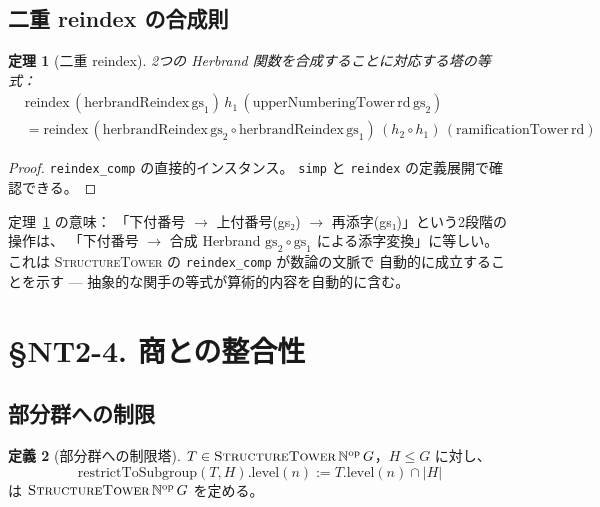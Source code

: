 \documentclass[a4paper,11pt]{ltjsarticle}
\theoremstyle{definition}
\newtheorem{definition}{定義}[section]
\theoremstyle{plain}
\newtheorem{theorem}[definition]{定理}
\theoremstyle{remark}
\begin{document}
\subsection{二重 reindex の合成則}

\begin{theorem}[二重 reindex]\label{thm:double-reindex}
  2つの Herbrand 関数を合成することに対応する塔の等式：
  \begin{align*}
    &\mathrm{reindex}\,(\mathrm{herbrandReindex}\,\mathrm{gs}_1)\,h_1\,
     (\mathrm{upperNumberingTower}\,\mathrm{rd}\,\mathrm{gs}_2) \\
    &= \mathrm{reindex}\,(\mathrm{herbrandReindex}\,\mathrm{gs}_2 \circ \mathrm{herbrandReindex}\,\mathrm{gs}_1)\,
       (h_2 \circ h_1)\,(\mathrm{ramificationTower}\,\mathrm{rd})
  \end{align*}
\end{theorem}

\begin{proof}
  \texttt{reindex\_comp} の直接的インスタンス。
  \texttt{simp} と \texttt{reindex} の定義展開で確認できる。
\end{proof}

\begin{mathinsight}
定理~\ref{thm:double-reindex} の意味：
「下付番号 $\to$ 上付番号(gs₂) $\to$ 再添字(gs₁)」という2段階の操作は、
「下付番号 $\to$ 合成 Herbrand $\mathrm{gs}_2 \circ \mathrm{gs}_1$ による添字変換」に等しい。
これは \textsc{StructureTower} の \texttt{reindex\_comp} が数論の文脈で
自動的に成立することを示す — 抽象的な関手の等式が算術的内容を自動的に含む。
\end{mathinsight}

\section{\S NT2-4. 商との整合性}

\subsection{部分群への制限}

\begin{definition}[部分群への制限塔]\label{def:restrict-subgroup}
  $T \in \textsc{StructureTower}\,\mathbb{N}^{\mathrm{op}}\,G$，$H \leq G$ に対し、
  \[
    \mathrm{restrictToSubgroup}(T,H).\mathrm{level}(n) := T.\mathrm{level}(n) \cap \lvert H\rvert
  \]
  は $\textsc{StructureTower}\,\mathbb{N}^{\mathrm{op}}\,G$ を定める。
\end{definition}
\end{document}
